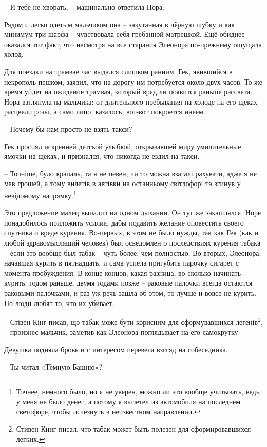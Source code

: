 \documentclass[
  a5paperpaper,
  DIV=11,
  numbers=noendperiod]{scrreprt}
\begin{document}
-- И тебе не хворать, -- машинально ответила Нора.

Рядом с легко одетым мальчиком она -- закутанная в чёрную шубку и как
минимум три шарфа -- чувствовала себя гребанной матрешкой. Ещё обиднее
оказался тот факт, что несмотря на все старания Элеонора по-прежнему
ощущала холод.

Для поездки на трамвае час выдался слишком ранним. Гек, явившийся в
некрополь пешком, заявил, что на дорогу им потребуется около двух часов.
То же время уйдет на ожидание трамвая, который вряд ли появится раньше
рассвета. Нора взглянула на мальчика: от длительного пребывания на
холоде на его щеках расцвели розы, а само лицо, казалось, вот-вот
покроется инеем.

-- Почему бы нам просто не взять такси?

Гек просиял искренней детской улыбкой, открывавшей миру умилительные
ямочки на щеках, и признался, что никогда не ездил на такси.

-- Точніше, було крапаль, та я не певен, чи то можна взагалі рахувати,
адже я не мав грошей, а тому вилетів в автівки на останньому світлофорі
та згинув у невідомому напрямку.\footnote{Точнее, немного было, но я не
  уверен, можно ли это вообще учитывать, ведь у меня не было денег, а
  потому я вылетел из автомобиля на последнем светофоре, чтобы исчезнуть
  в неизвестном направлении.}

Это предложение малец выпалил на одном дыхании. Он тут же закашлялся.
Норе понадобилось приложить усилия, дабы подавить желание оповестить
своего спутника о вреде курения. Во-первых, в этом не было нужды, так
как Гек (как и любой здравомыслящий человек) был осведомлен о
последствиях курения табака -- если это вообще был табак -- чуть более,
чем полностью. Во-вторых, Элеонора, начавшая курить в пятнадцать, и сама
успела пригубить парочку сигарет с момента пробуждения. В конце концов,
какая разница, во сколько начинать курить: годом раньше, двумя годами
позже -- раковые палочки всегда остаются раковыми палочками, и раз уж
речь зашла об этом, то лучше и вовсе не курить. Но люди любят то, что их
убивает.

-- Стівен Кінг писав, що табак може бути корисним для сформувавшихся
легенів\footnote{Стивен Кинг писал, что табак может быть полезен для
  сформировавшихся легких.}, -- произнес мальчик, заметив как Элеонора
поглядывает на его самокрутку.

Девушка подняла бровь и с интересом перевела взгляд на собеседника.

-- Ты читал «Тёмную Башню»?
\end{document}

